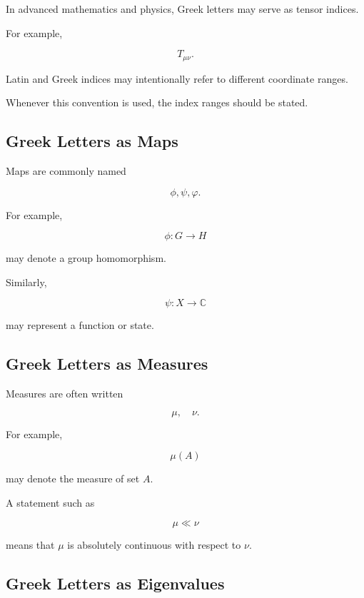 In advanced mathematics and physics, Greek letters may serve as tensor
indices.

For example,

\[
\boxed{
T_{\mu\nu}.
}
\]

Latin and Greek indices may intentionally refer to different coordinate
ranges.

Whenever this convention is used, the index ranges should be stated.

\subsection{Greek Letters as Maps}
\label{subsec:greek-maps}

Maps are commonly named

\[
\boxed{
\phi,
\psi,
\varphi.
}
\]

For example,

\[
\boxed{
\phi:G\to H
}
\]

may denote a group homomorphism.

Similarly,

\[
\boxed{
\psi:X\to\mathbb{C}
}
\]

may represent a function or state.

\subsection{Greek Letters as Measures}
\label{subsec:greek-measures}

Measures are often written

\[
\boxed{
\mu,
\quad
\nu.
}
\]

For example,

\[
\boxed{
\mu(A)
}
\]

may denote the measure of set \(A\).

A statement such as

\[
\boxed{
\mu\ll\nu
}
\]

means that \(\mu\) is absolutely continuous with respect to \(\nu\).

\subsection{Greek Letters as Eigenvalues}
\label{subsec:greek-eigenvalues}


